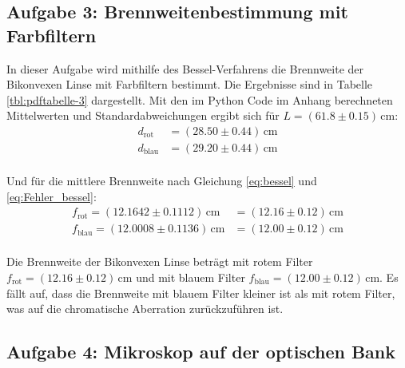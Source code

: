\documentclass[12pt,a4paper,titlepage]{scrartcl}
\numberwithin{equation}{section}
\numberwithin{table}{section}
\numberwithin{figure}{section}
\begin{document}
\subsection{Aufgabe 3: Brennweitenbestimmung mit Farbfiltern}
In dieser Aufgabe wird mithilfe des Bessel-Verfahrens die Brennweite der Bikonvexen Linse mit Farbfiltern bestimmt. Die Ergebnisse sind in Tabelle \ref{tbl:pdftabelle-3} dargestellt.
Mit den im Python Code im Anhang berechneten Mittelwerten und Standardabweichungen ergibt sich für $L = (61.8\pm 0.15)\,\si{\centi\meter}$: 
\begin{align*}
    d_\text{rot} &= (28.50\pm 0.44)\,\si{\centi\meter}\\
    d_\text{blau} &= (29.20\pm 0.44)\,\si{\centi\meter}\\
\end{align*}

Und für die mittlere Brennweite nach Gleichung \ref{eq:bessel} und \ref{eq:Fehler_bessel}:
\begin{align*}
    f_\text{rot} = (12.1642\pm 0.1112)\,\si{\centi\meter} &=(12.16\pm 0.12)\,\si{\centi\meter}\\
    f_\text{blau} = (12.0008\pm 0.1136)\,\si{\centi\meter} &=(12.00\pm 0.12)\,\si{\centi\meter}\\
\end{align*}

\begin{resultbox}
    Die Brennweite der Bikonvexen Linse beträgt mit rotem Filter $f_\text{rot} = (12.16\pm 0.12)\,\si{\centi\meter}$ und mit blauem Filter $f_\text{blau} = (12.00\pm 0.12)\,\si{\centi\meter}$.
    Es fällt auf, dass die Brennweite mit blauem Filter kleiner ist als mit rotem Filter, was auf die chromatische Aberration zurückzuführen ist.
    
\end{resultbox}

\subsection{Aufgabe 4: Mikroskop auf der optischen Bank}
\end{document}
